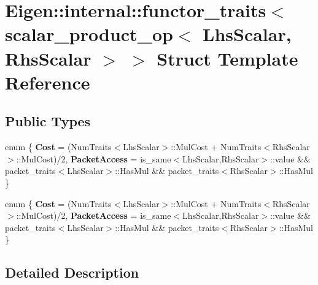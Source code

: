 \hypertarget{struct_eigen_1_1internal_1_1functor__traits_3_01scalar__product__op_3_01_lhs_scalar_00_01_rhs_scalar_01_4_01_4}{}\section{Eigen\+:\+:internal\+:\+:functor\+\_\+traits$<$ scalar\+\_\+product\+\_\+op$<$ Lhs\+Scalar, Rhs\+Scalar $>$ $>$ Struct Template Reference}
\label{struct_eigen_1_1internal_1_1functor__traits_3_01scalar__product__op_3_01_lhs_scalar_00_01_rhs_scalar_01_4_01_4}
\subsection*{Public Types}
\begin{DoxyCompactItemize}
\item 
\mbox{\label{struct_eigen_1_1internal_1_1functor__traits_3_01scalar__product__op_3_01_lhs_scalar_00_01_rhs_scalar_01_4_01_4_ac9aea08c8a8ea6736a1e9d4de415d571}} 
enum \{ {\bfseries Cost} = (Num\+Traits$<$Lhs\+Scalar$>$\+:\+:Mul\+Cost + Num\+Traits$<$Rhs\+Scalar$>$\+:\+:Mul\+Cost)/2, 
{\bfseries Packet\+Access} = is\+\_\+same$<$Lhs\+Scalar,Rhs\+Scalar$>$\+:\+:value \&\& packet\+\_\+traits$<$Lhs\+Scalar$>$\+:\+:Has\+Mul \&\& packet\+\_\+traits$<$Rhs\+Scalar$>$\+:\+:Has\+Mul
 \}
\item 
\mbox{\label{struct_eigen_1_1internal_1_1functor__traits_3_01scalar__product__op_3_01_lhs_scalar_00_01_rhs_scalar_01_4_01_4_ae2aa69ab60094110559c4904f954b207}} 
enum \{ {\bfseries Cost} = (Num\+Traits$<$Lhs\+Scalar$>$\+:\+:Mul\+Cost + Num\+Traits$<$Rhs\+Scalar$>$\+:\+:Mul\+Cost)/2, 
{\bfseries Packet\+Access} = is\+\_\+same$<$Lhs\+Scalar,Rhs\+Scalar$>$\+:\+:value \&\& packet\+\_\+traits$<$Lhs\+Scalar$>$\+:\+:Has\+Mul \&\& packet\+\_\+traits$<$Rhs\+Scalar$>$\+:\+:Has\+Mul
 \}
\end{DoxyCompactItemize}


\subsection{Detailed Description}
